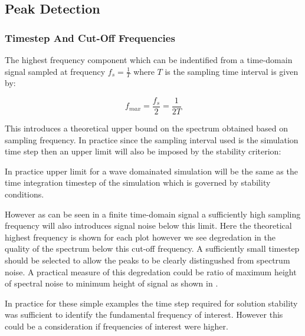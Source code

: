 \subsection{Peak Detection}

\subsubsection{Timestep And Cut-Off Frequencies}


% 

The highest frequency component which can be indentified from a time-domain signal sampled at frequency $f_{s} = \frac{1}{T}$ where $T$ is the sampling time interval is given by:

$$f_{max} = \frac{f_s}{2} = \frac{1}{2T} $$

This introduces a theoretical upper bound on the spectrum obtained based on sampling frequency. In practice since the sampling interval used is the simulation time step then an upper limit will also be imposed by the stability criterion:


In practice upper limit for a wave domainated simulation will be the same as the time integration timestep of the simulation which is governed by stability conditions.

However as can be seen in  a finite time-domain signal a sufficiently high sampling frequency will also introduces signal noise below this limit. Here the theoretical highest frequency is shown for each plot however we see degredation in the quality of the spectrum below this cut-off frequency. A sufficiently small timestep should be selected to allow the peaks to be clearly distingushed from spectrum noise. A practical measure of this degredation could be ratio of maximum height of spectral noise to minimum height of signal as shown in . 


In practice for these simple examples the time step required for solution stability was sufficient to identify the fundamental frequency of interest. However this could be a consideration if frequencies of interest were higher. %

